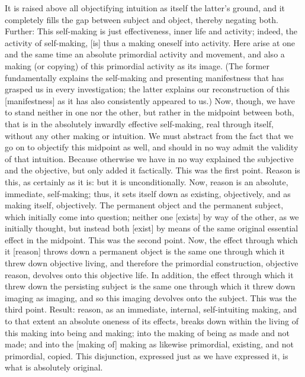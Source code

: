 It is raised above all objectifying intuition
as itself the latter's ground,
and it completely fills the gap
between subject and object,
thereby negating both.
Further:
This self-making is just effectiveness,
inner life and activity;
indeed, the activity of self-making, [is]
thus a making oneself into activity.
Here arise at one and the same time
an absolute primordial activity and movement,
and also a making (or copying) of
this primordial activity as its image.
(The former fundamentally explains
the self-making and presenting manifestness
that has grasped us in every investigation;
the latter explains our reconstruction
of this [manifestness]
as it has also consistently appeared to us.)
Now, though, we have to stand
neither in one nor the other,
but rather in the midpoint between both,
that is in the absolutely inwardly
effective self-making,
real through itself,
without any other making or intuition.
We must abstract from the fact
that we go on to objectify
this midpoint as well,
and should in no way admit
the validity of that intuition.
Because otherwise we have in no way
explained the subjective and the objective,
but only added it factically.
This was the first point.
Reason is this, as certainly as it is:
but it is unconditionally.
Now, reason is an absolute, immediate, self-making;
thus, it sets itself down as existing, objectively,
and as making itself, objectively.
The permanent object and the permanent subject,
which initially come into question;
neither one [exists] by way of the other,
as we initially thought,
but instead both [exist] by means of
the same original essential effect in the midpoint.
This was the second point.
Now, the effect through which
it [reason] throws down a permanent object is
the same one through which it threw down objective living,
and therefore the primordial construction,
objective reason, devolves onto this objective life.
In addition, the effect through which
it threw down the persisting subject is
the same one through which it threw down imaging as imaging,
and so this imaging devolves onto the subject.
This was the third point.
Result:
reason, as an immediate, internal, self-intuiting making,
and to that extent an absolute oneness of its effects,
breaks down within the living of this making
into being and making;
into the making of being as made and not made;
and into the [making of] making
as likewise primordial, existing,
and not primordial, copied.
This disjunction, expressed just as we have expressed it,
is what is absolutely original.

